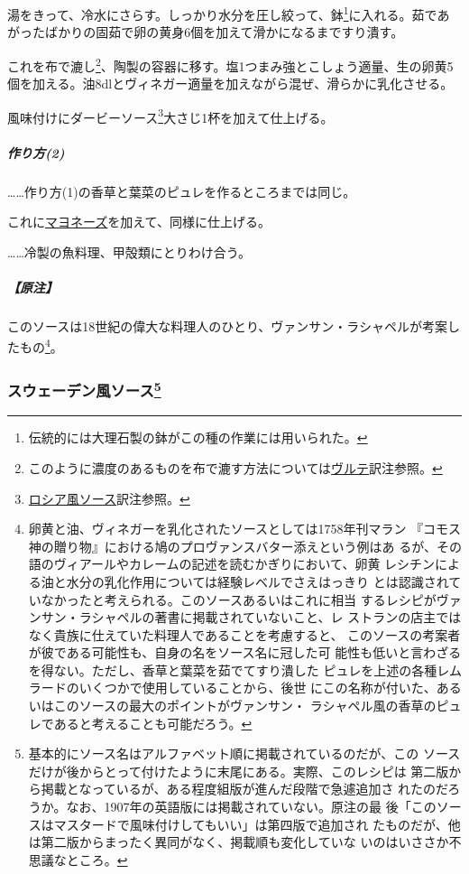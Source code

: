 \begin{recette}
湯をきって、冷水にさらす。しっかり水分を圧し絞って、鉢\footnote{伝統的には大理石製の鉢がこの種の作業には用いられた。}に入れる。茹であがったばかりの固茹で卵の黄身6個を加えて滑かになるまですり潰す。

これを布で漉し\footnote{このように濃度のあるものを布で漉す方法については\protect\hyperlink{veloute}{ヴルテ}訳注参照。}、陶製の容器に移す。塩1つまみ強とこしょう適量、生の卵黄5個を加える。油8dlとヴィネガー適量を加えながら混ぜ、滑らかに乳化させる。

風味付けにダービーソース\footnote{\protect\hyperlink{sauce-russe-froide}{ロシア風ソース}訳注参照。}大さじ1杯を加えて仕上げる。

\hypertarget{ux4f5cux308aux65b92}{%
\subparagraph{作り方(2)}\label{ux4f5cux308aux65b92}}

\ldots{}\ldots{}作り方(1)の香草と葉菜のピュレを作るところまでは同じ。

これに\protect\hyperlink{mayonnaise}{マヨネーズ}を加えて、同様に仕上げる。

\ldots{}\ldots{}冷製の魚料理、甲殻類にとりわけ合う。

\hypertarget{ux539fux6ce8-4}{%
\subparagraph{【原注】}\label{ux539fux6ce8-4}}

このソースは18世紀の偉大な料理人のひとり、ヴァンサン・ラシャペルが考案したもの\footnote{卵黄と油、ヴィネガーを乳化されたソースとしては1758年刊マラン
  『コモス神の贈り物』における鳩のプロヴァンスバター添えという例はあ
  るが、その語のヴィアールやカレームの記述を読むかぎりにおいて、卵黄
  レシチンによる油と水分の乳化作用については経験レベルでさえはっきり
  とは認識されていなかったと考えられる。このソースあるいはこれに相当
  するレシピがヴァンサン・ラシャペルの著書に掲載されていないこと、レ
  ストランの店主ではなく貴族に仕えていた料理人であることを考慮すると、
  このソースの考案者が彼である可能性も、自身の名をソース名に冠した可
  能性も低いと言わざるを得ない。ただし、香草と葉菜を茹でてすり潰した
  ピュレを上述の各種レムラードのいくつかで使用していることから、後世
  にこの名称が付いた、あるいはこのソースの最大のポイントがヴァンサン・
  ラシャペル風の香草のピュレであると考えることも可能だろう。}。

\maeaki

\hypertarget{ux30b9ux30a6ux30a7ux30fcux30c7ux30f3ux98a8ux30bdux30fcux30b953}{%
\subsubsection[スウェーデン風ソース]{\texorpdfstring{スウェーデン風ソース\footnote{基本的にソース名はアルファベット順に掲載されているのだが、この
  ソースだけが後からとって付けたように末尾にある。実際、このレシピは
  第二版から掲載となっているが、ある程度組版が進んだ段階で急遽追加さ
  れたのだろうか。なお、1907年の英語版には掲載されていない。原注の最
  後「このソースはマスタードで風味付けしてもいい」は第四版で追加され
  たものだが、他は第二版からまったく異同がなく、掲載順も変化していな
  いのはいささか不思議なところ。}}{スウェーデン風ソース}}\label{ux30b9ux30a6ux30a7ux30fcux30c7ux30f3ux98a8ux30bdux30fcux30b953}}


\end{recette}
